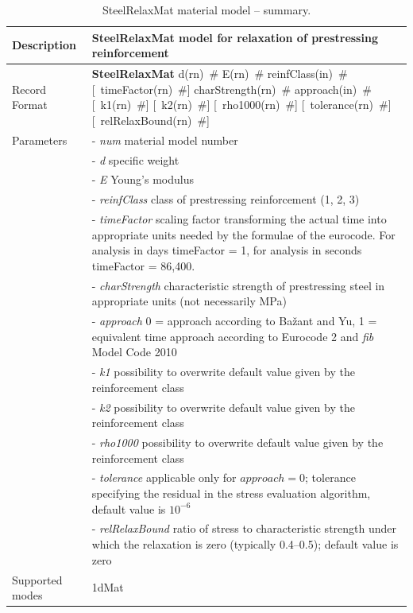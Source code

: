 \documentclass[a4paper]{article}
\newcommand{\descitem}[1]{{\noindent \bf #1}}
\newcommand{\elemparam}[2]{{{#1\tiny (#2)}~\#}}
\newcommand{\optelemparam}[2]{[{~\elemparam{#1}{#2}}]}
\newcommand{\param}[1]{{\it #1}}
\newenvironment{mmt}{\begin{tabular}{|l|p{9cm}|}}{\end{tabular}\\}
\newenvironment{mmt}{\begin{tabular}{|l|l|}}{\end{tabular}\\}
\begin{document}
\begin{table}[!htb]
\begin{mmt}
\hline
Description & SteelRelaxMat model for relaxation of prestressing reinforcement\\
\hline
Record Format & \descitem{SteelRelaxMat}
\elemparam{d}{rn}
\elemparam{E}{rn}
\elemparam{reinfClass}{in}
\optelemparam{timeFactor}{rn}
\elemparam{charStrength}{rn}
\elemparam{approach}{in}
\optelemparam{k1}{rn}
\optelemparam{k2}{rn}
\optelemparam{rho1000}{rn}
\optelemparam{tolerance}{rn}
\optelemparam{relRelaxBound}{rn}\\
Parameters &- \param{num} material model number\\
&- \param{d} specific weight\\
&- \param{E} Young's modulus \\
&- \param{reinfClass} class of prestressing reinforcement (1, 2, 3) \\
&- \param{timeFactor} scaling factor transforming the actual time into
appropriate units needed by the formulae of the eurocode. For analysis
in days timeFactor = 1, for analysis in seconds timeFactor = 86,400.\\
&- \param{charStrength} characteristic strength of prestressing steel
in appropriate units (not necessarily MPa)\\
&- \param{approach} 0 = approach according to Ba\v{z}ant and Yu, 1 =
equivalent time approach according to Eurocode 2 and {\sl{fib}} Model Code 2010 \\
&- \param{k1} possibility to overwrite default value given by the
reinforcement class\\
&- \param{k2} possibility to overwrite default value given by the
reinforcement class\\
&- \param{rho1000} possibility to overwrite default value given by the
reinforcement class\\
&- \param{tolerance} applicable only for $approach = 0$; tolerance
specifying the residual in the stress evaluation algorithm, default
value is $10^{-6}$\\
&- \param{relRelaxBound} ratio of stress to characteristic strength
under which the relaxation is zero (typically 0.4--0.5); default
value is zero\\


Supported modes& 1dMat\\
\hline
\end{mmt}
\caption{SteelRelaxMat material model -- summary.}
\label{steelRelax_table}
\end{table}
\end{document}

